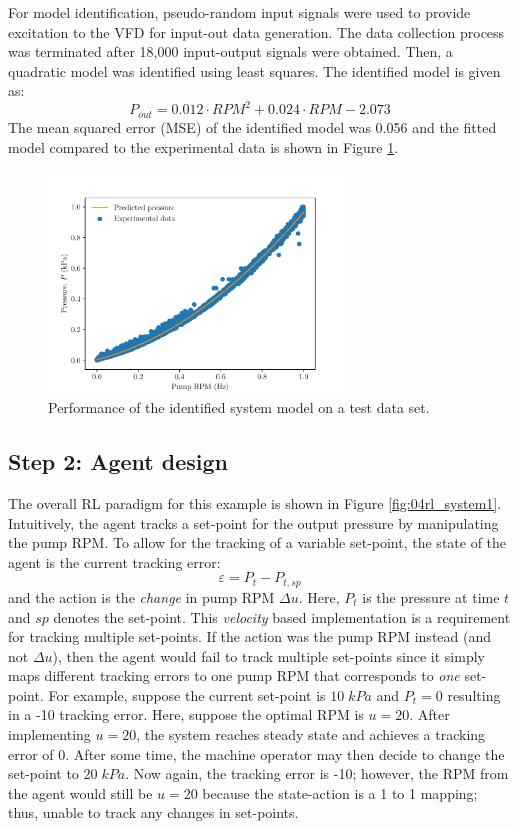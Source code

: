 For model identification, pseudo-random input signals were used to provide excitation to the VFD for input-out data generation. The data collection process was terminated after 18,000 input-output signals were obtained. Then, a quadratic model was identified using least squares. The identified model is given as:
\begin{equation}
    P_{out} = 0.012 \cdot RPM^2 + 0.024 \cdot RPM - 2.073
\end{equation}
The mean squared error (MSE) of the identified model was 0.056 and the fitted model compared to the experimental data is shown in Figure \ref{fig:04model_fit}.
\begin{figure}[H]
    \centering
    \includegraphics[width=0.7\textwidth]{images/ch4/model_fit.pdf}
    \caption{Performance of the identified system model on a test data set.}
    \label{fig:04model_fit}
\end{figure}

\subsection{Step 2: Agent design}
The overall RL paradigm for this example is shown in Figure \ref{fig:04rl_system1}. Intuitively, the agent tracks a set-point for the output pressure by manipulating the pump RPM.  To allow for the tracking of a variable set-point, the state of the agent is the current tracking error:
\begin{equation}
    \varepsilon = P_t - P_{t, sp}
\end{equation}
and the action is the \textit{change} in pump RPM $\Delta u$. Here, $P_t$ is the pressure at time $t$ and $sp$ denotes the set-point. This \textit{velocity} based implementation is a requirement for tracking multiple set-points. If the action was the pump RPM instead (and not $\Delta u$), then the agent would fail to track multiple set-points since it simply maps different tracking errors to one pump RPM that corresponds to \textit{one} set-point. For example, suppose the current set-point is $10 \; kPa$ and $P_t = 0$ resulting in a -10 tracking error. Here, suppose the optimal RPM is $u = 20$. After implementing $u = 20$, the system reaches steady state and achieves a tracking error of 0. After some time, the machine operator may then decide to change the set-point to $20 \; kPa$. Now again, the tracking error is -10; however, the RPM from the agent would still be $u = 20$ because the state-action is a 1 to 1 mapping; thus, unable to track any changes in set-points. 

